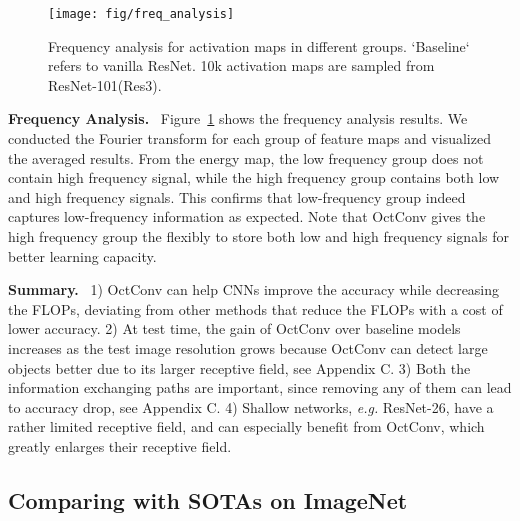 \documentclass[10pt,twocolumn,letterpaper]{article}
\newcommand{\hiConv}[0]{OctConv\xspace}
\newcommand{\myparagraph}[1]{\vspace{1pt}\noindent\textbf{#1.}~}
\begin{document}
\begin{figure}[t]
\centering
\vspace{-3mm}
\texttt{[image: fig/freq\_analysis]}
\vspace{-1mm}
\caption{Frequency analysis for activation maps in different groups. `Baseline` refers to vanilla ResNet. 10k activation maps are sampled from ResNet-101(Res3).}
\label{fig:freq}
\end{figure}

\myparagraph{Frequency Analysis}
Figure~\ref{fig:freq} shows the frequency analysis results. We conducted the Fourier transform for each group of feature maps and visualized the averaged results. From the energy map, the low frequency group does not contain high frequency signal, while the high frequency group contains both low and high frequency signals. This confirms that low-frequency group indeed captures low-frequency information as expected. Note that OctConv gives the high frequency group the flexibly to store both low and high frequency signals for better learning capacity.


\myparagraph{Summary}
1) \hiConv can help CNNs improve the accuracy while decreasing the FLOPs, deviating from other methods that reduce the FLOPs with a cost of lower accuracy. 2) At test time, the gain of \hiConv over baseline models increases as the test image resolution grows because \hiConv can detect large objects better due to its larger receptive field, see Appendix C. 3) Both the information exchanging paths are important, since removing any of them can lead to accuracy drop, see Appendix C. 4) Shallow networks, \emph{e.g.} ResNet-26, have a rather limited receptive field, and can especially benefit from \hiConv, which greatly enlarges their receptive field.



\subsection{Comparing with SOTAs on ImageNet}
\label{sec:exp:imgcls:sota}
\end{document}
